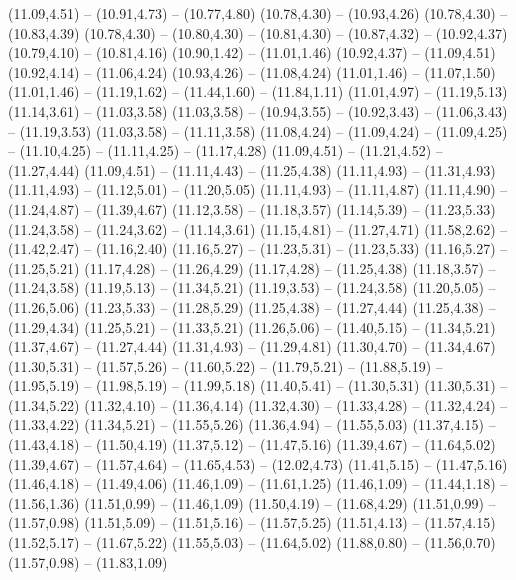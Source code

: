 {  (11.09,4.51) -- (10.91,4.73) -- (10.77,4.80)
  (10.78,4.30) -- (10.93,4.26)
  (10.78,4.30) -- (10.83,4.39)
  (10.78,4.30) -- (10.80,4.30) -- (10.81,4.30) -- (10.87,4.32) -- (10.92,4.37)
  (10.79,4.10) -- (10.81,4.16)
  (10.90,1.42) -- (11.01,1.46)
  (10.92,4.37) -- (11.09,4.51)
  (10.92,4.14) -- (11.06,4.24)
  (10.93,4.26) -- (11.08,4.24)
  (11.01,1.46) -- (11.07,1.50)
  (11.01,1.46) -- (11.19,1.62) -- (11.44,1.60) -- (11.84,1.11)
  (11.01,4.97) -- (11.19,5.13)
  (11.14,3.61) -- (11.03,3.58)
  (11.03,3.58) -- (10.94,3.55) -- (10.92,3.43) -- (11.06,3.43) -- (11.19,3.53)
  (11.03,3.58) -- (11.11,3.58)
  (11.08,4.24) -- (11.09,4.24) -- (11.09,4.25) -- (11.10,4.25) -- (11.11,4.25) -- (11.17,4.28)
  (11.09,4.51) -- (11.21,4.52) -- (11.27,4.44)
  (11.09,4.51) -- (11.11,4.43) -- (11.25,4.38)
  (11.11,4.93) -- (11.31,4.93)
  (11.11,4.93) -- (11.12,5.01) -- (11.20,5.05)
  (11.11,4.93) -- (11.11,4.87)
  (11.11,4.90) -- (11.24,4.87) -- (11.39,4.67)
  (11.12,3.58) -- (11.18,3.57)
  (11.14,5.39) -- (11.23,5.33)
  (11.24,3.58) -- (11.24,3.62) -- (11.14,3.61)
  (11.15,4.81) -- (11.27,4.71)
  (11.58,2.62) -- (11.42,2.47) -- (11.16,2.40)
  (11.16,5.27) -- (11.23,5.31) -- (11.23,5.33)
  (11.16,5.27) -- (11.25,5.21)
  (11.17,4.28) -- (11.26,4.29)
  (11.17,4.28) -- (11.25,4.38)
  (11.18,3.57) -- (11.24,3.58)
  (11.19,5.13) -- (11.34,5.21)
  (11.19,3.53) -- (11.24,3.58)
  (11.20,5.05) -- (11.26,5.06)
  (11.23,5.33) -- (11.28,5.29)
  (11.25,4.38) -- (11.27,4.44)
  (11.25,4.38) -- (11.29,4.34)
  (11.25,5.21) -- (11.33,5.21)
  (11.26,5.06) -- (11.40,5.15) -- (11.34,5.21)
  (11.37,4.67) -- (11.27,4.44)
  (11.31,4.93) -- (11.29,4.81)
  (11.30,4.70) -- (11.34,4.67)
  (11.30,5.31) -- (11.57,5.26) -- (11.60,5.22) -- (11.79,5.21) -- (11.88,5.19) -- (11.95,5.19) -- (11.98,5.19) -- (11.99,5.18)
  (11.40,5.41) -- (11.30,5.31)
  (11.30,5.31) -- (11.34,5.22)
  (11.32,4.10) -- (11.36,4.14)
  (11.32,4.30) -- (11.33,4.28) -- (11.32,4.24) -- (11.33,4.22)
  (11.34,5.21) -- (11.55,5.26)
  (11.36,4.94) -- (11.55,5.03)
  (11.37,4.15) -- (11.43,4.18) -- (11.50,4.19)
  (11.37,5.12) -- (11.47,5.16)
  (11.39,4.67) -- (11.64,5.02)
  (11.39,4.67) -- (11.57,4.64) -- (11.65,4.53) -- (12.02,4.73)
  (11.41,5.15) -- (11.47,5.16)
  (11.46,4.18) -- (11.49,4.06)
  (11.46,1.09) -- (11.61,1.25)
  (11.46,1.09) -- (11.44,1.18) -- (11.56,1.36)
  (11.51,0.99) -- (11.46,1.09)
  (11.50,4.19) -- (11.68,4.29)
  (11.51,0.99) -- (11.57,0.98)
  (11.51,5.09) -- (11.51,5.16) -- (11.57,5.25)
  (11.51,4.13) -- (11.57,4.15)
  (11.52,5.17) -- (11.67,5.22)
  (11.55,5.03) -- (11.64,5.02)
  (11.88,0.80) -- (11.56,0.70)
  (11.57,0.98) -- (11.83,1.09)
}

